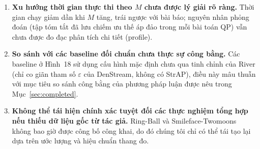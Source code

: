 \begin{enumerate}[label=\textbf{B\arabic*.},leftmargin=2.2em,itemsep=3pt]
  \item \textbf{Xu hướng thời gian thực thi theo $M$ chưa được lý giải rõ ràng.} Thời gian chạy giảm dần khi $M$ tăng, trái ngược với bài báo; nguyên nhân phỏng đoán (tập tóm tắt đã lưu chiếm ưu thế áp đảo trong mỗi bài toán QP) vẫn chưa được đo đạc phân tích chi tiết (profile).
  \item \textbf{So sánh với các baseline đối chuẩn chưa thực sự công bằng.} Các baseline ở Hình~18 sử dụng cấu hình mặc định chưa qua tinh chỉnh của River (chỉ co giãn tham số $\varepsilon$ của DenStream, không có StrAP), điều này mâu thuẫn với mục tiêu so sánh công bằng của phương pháp luận được nêu trong Mục~\ref{sec:completed}.
  \item \textbf{Không thể tái hiện chính xác tuyệt đối các thực nghiệm tổng hợp nếu thiếu dữ liệu gốc từ tác giả.} Ring-Ball và Smileface-Twomoons không bao giờ được công bố công khai, do đó chúng tôi chỉ có thể tái tạo lại dựa trên ước lượng và hiệu chuẩn thang đo.
\end{enumerate}
